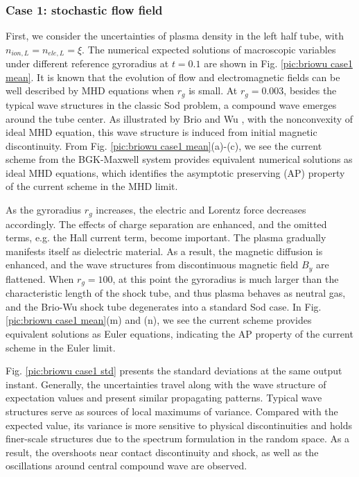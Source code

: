 \documentclass[preprint,3p,12pt,sort&compress]{elsarticle}
\begin{document}
\subsubsection{Case 1: stochastic flow field}

First, we consider the uncertainties of plasma density in the left half tube, with $n_{ion,L}=n_{ele,L}=\xi$.
The numerical expected solutions of macroscopic variables under different reference gyroradius at $t = 0.1$ are shown in Fig. \ref{pic:briowu case1 mean}.
It is known that the evolution of flow and electromagnetic fields can be well described by MHD equations when $r_g$ is small.
At $r_g = 0.003$, besides the typical wave structures in the classic Sod problem, a compound wave emerges around the tube center. 
As illustrated by Brio and Wu \cite{brio1988upwind}, with the nonconvexity of ideal MHD equation, this wave structure is induced from initial magnetic discontinuity.
From Fig. \ref{pic:briowu case1 mean}(a)-(c), we see the current scheme from the BGK-Maxwell system provides equivalent numerical solutions as ideal MHD equations,
which identifies the asymptotic preserving (AP) property of the current scheme in the MHD limit.

As the gyroradius $r_g$ increases, the electric and Lorentz force decreases accordingly.
The effects of charge separation are enhanced, and the omitted terms, e.g. the Hall current term, become important.
The plasma gradually manifests itself as dielectric material.
As a result, the magnetic diffusion is enhanced, and the wave structures from discontinuous magnetic field $B_y$ are flattened.
When $r_g = 100$, at this point the gyroradius is much larger than the characteristic length of the shock tube, and thus plasma behaves as neutral gas, and the Brio-Wu shock tube degenerates into a standard Sod case. 
In Fig. \ref{pic:briowu case1 mean}(m) and (n), we see the current scheme provides equivalent solutions as Euler equations, indicating the AP property of the current scheme in the Euler limit.

Fig. \ref{pic:briowu case1 std} presents the standard deviations at the same output instant. 
Generally, the uncertainties travel along with the wave structure of expectation values and present similar propagating patterns. 
Typical wave structures serve as sources of local maximums of variance.
Compared with the expected value, its variance is more sensitive to physical discontinuities and holds finer-scale structures due to the spectrum formulation in the random space. 
As a result, the overshoots near contact discontinuity and shock, as well as the oscillations around central compound wave are observed.
\end{document}
